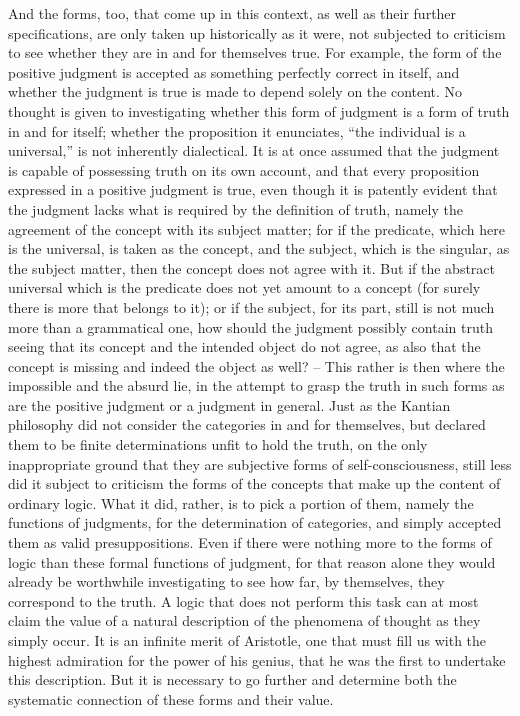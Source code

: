 And the forms, too, that come up in this context, as well
as their further specifications, are only taken up historically as it were, not
subjected to criticism to see whether they are in and for themselves true.
For example, the form of the positive judgment is accepted as something
perfectly correct in itself, and whether the judgment is true is made to
depend solely on the content. No thought is given to investigating whether
this form of judgment is a form of truth in and for itself; whether the
proposition it enunciates, “the individual is a universal,” is not inherently
dialectical. It is at once assumed that the judgment is capable of possessing
truth on its own account, and that every proposition expressed in a positive
judgment is true, even though it is patently evident that the judgment lacks
what is required by the definition of truth, namely the agreement of the
concept with its subject matter; for if the predicate, which here is the
universal, is taken as the concept, and the subject, which is the singular,
as the subject matter, then the concept does not agree with it. But if the
abstract universal which is the predicate does not yet amount to a concept
(for surely there is more that belongs to it); or if the subject, for its part,
still is not much more than a grammatical one, how should the judgment
possibly contain truth seeing that its concept and the intended object do
not agree, as also that the concept is missing and indeed the object as well? –
This rather is then where the impossible and the absurd lie, in the attempt
to grasp the truth in such forms as are the positive judgment or a judgment
in general. Just as the Kantian philosophy did not consider the categories
in and for themselves, but declared them to be finite determinations unfit
to hold the truth, on the only inappropriate ground that they are subjective
forms of self-consciousness, still less did it subject to criticism the forms
of the concepts that make up the content of ordinary logic. What it did,
rather, is to pick a portion of them, namely the functions of judgments,
for the determination of categories, and simply accepted them as valid
presuppositions. Even if there were nothing more to the forms of logic
than these formal functions of judgment, for that reason alone they would
already be worthwhile investigating to see how far, by themselves, they
correspond to the truth. A logic that does not perform this task can at most
claim the value of a natural description of the phenomena of thought as
they simply occur. It is an infinite merit of Aristotle, one that must fill us
with the highest admiration for the power of his genius, that he was the
first to undertake this description. But it is necessary to go further and
determine both the systematic connection of these forms and their value.
